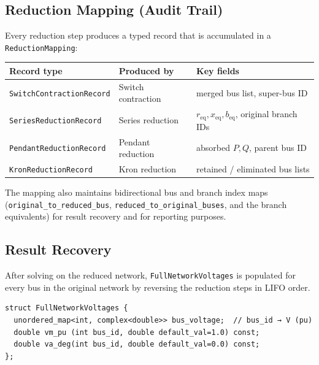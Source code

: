 \subsection{Reduction Mapping (Audit Trail)}
\label{sec:graph-mapping}

Every reduction step produces a typed record that is accumulated in a
\texttt{ReductionMapping}:

\begin{center}
\begin{tabular}{lll}
\hline\hline
\textbf{Record type} & \textbf{Produced by} & \textbf{Key fields} \\
\hline
\texttt{SwitchContractionRecord} & Switch contraction & merged bus list, super-bus ID \\
\texttt{SeriesReductionRecord}   & Series reduction   & $r_{\text{eq}}, x_{\text{eq}}, b_{\text{eq}}$, original branch IDs \\
\texttt{PendantReductionRecord}  & Pendant reduction  & absorbed $P, Q$, parent bus ID \\
\texttt{KronReductionRecord}     & Kron reduction     & retained / eliminated bus lists \\
\hline\hline
\end{tabular}
\end{center}

The mapping also maintains bidirectional bus and branch index maps
(\texttt{original\_to\_reduced\_bus}, \texttt{reduced\_to\_original\_buses},
and the branch equivalents) for result recovery and for reporting purposes.

\subsection{Result Recovery}
\label{sec:graph-recovery}

After solving on the reduced network, \texttt{FullNetworkVoltages} is
populated for every bus in the original network by reversing the reduction
steps in LIFO order.

\begin{verbatim}
struct FullNetworkVoltages {
  unordered_map<int, complex<double>> bus_voltage;  // bus_id → V (pu)
  double vm_pu (int bus_id, double default_val=1.0) const;
  double va_deg(int bus_id, double default_val=0.0) const;
};
\end{verbatim}

